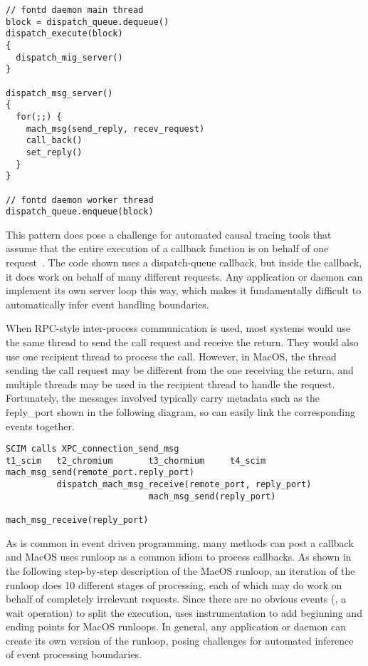 {\footnotesize \begin{verbatim}
// fontd daemon main thread
block = dispatch_queue.dequeue()
dispatch_execute(block)
{
  dispatch_mig_server()
}

dispatch_msg_server()
{
  for(;;) {
    mach_msg(send_reply, recev_request)
    call_back()
    set_reply()
  }
}

// fontd daemon worker thread
dispatch_queue.enqueue(block)
\end{verbatim}
}

This pattern does pose a challenge for automated causal tracing tools that
assume that the entire execution of a callback function is on behalf of
one request~\cite{xxx}.  The code shown uses a dispatch-queue callback,
but inside the callback, it does work on behalf of many different
requests.  Any application or daemon can implement its  own server loop
this way, which makes it fundamentally difficult to automatically infer
event handling boundaries.

When RPC-style inter-process communication is used, most systems would use
the same thread to send the call request and receive the return.  They
would also use one recipient thread to process the call.  However, in
MacOS, the thread sending the call request may be different from the one
receiving the return, and multiple threads may be used in the recipient
thread to handle the request.  Fortunately, the messages involved
typically carry metadata such as the \v{reply\_port} shown in the
following diagram, so \xxx can easily link the corresponding events
together.

{\footnotesize \begin{verbatim}
SCIM calls XPC_connection_send_msg
t1_scim   t2_chromium       t3_chormium     t4_scim
mach_msg_send(remote_port.reply_port)
          dispatch_mach_msg_receive(remote_port, reply_port)
                            mach_msg_send(reply_port)
                                             mach_msg_receive(reply_port)
\end{verbatim}
}

As is common in event driven programming, many methods can post a callback
and MacOS uses runloop as a common idiom to process callbacks.  As shown
in the following step-by-step description of the MacOS runloop, an
iteration of the runloop does 10 different stages of processing, each of
which may do work on behalf of completely irrelevant requests.  Since
there are no obvious events (\eg, a wait operation) to split the
execution, \xxx uses instrumentation to add beginning and ending points
for MacOS runloops.  In general, any application or daemon can create
its own version of the runloop, posing challenges for automated
inference of event processing boundaries.


